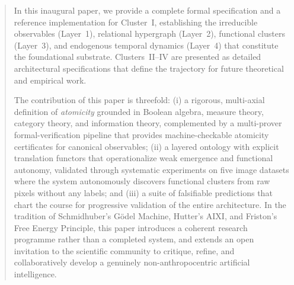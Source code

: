 \begin{abstract}
In this inaugural paper, we provide a complete formal specification and a
reference implementation for Cluster~I, establishing the irreducible
observables (Layer~1), relational hypergraph (Layer~2), functional clusters
(Layer~3), and endogenous temporal dynamics (Layer~4) that constitute the
foundational substrate.  Clusters~II--IV are presented as detailed
architectural specifications that define the trajectory for future
theoretical and empirical work.

The contribution of this paper is threefold: (i) a rigorous, multi-axial
definition of \emph{atomicity} grounded in Boolean algebra, measure theory,
category theory, and information theory, complemented by a multi-prover
formal-verification pipeline that provides machine-checkable atomicity
certificates for canonical observables; (ii) a layered ontology with
explicit translation functors that operationalize weak emergence and
functional autonomy, validated through systematic experiments on five
image datasets where the system autonomously discovers functional clusters
from raw pixels without any labels; and (iii) a suite of falsifiable
predictions that chart the course for progressive validation of the entire
architecture.  In the tradition of Schmidhuber's G\"odel Machine, Hutter's
AIXI, and Friston's Free Energy Principle, this paper introduces a
coherent research programme rather than a completed system, and extends
an open invitation to the scientific community to critique, refine, and
collaboratively develop a genuinely non-anthropocentric artificial
intelligence.
\end{abstract}